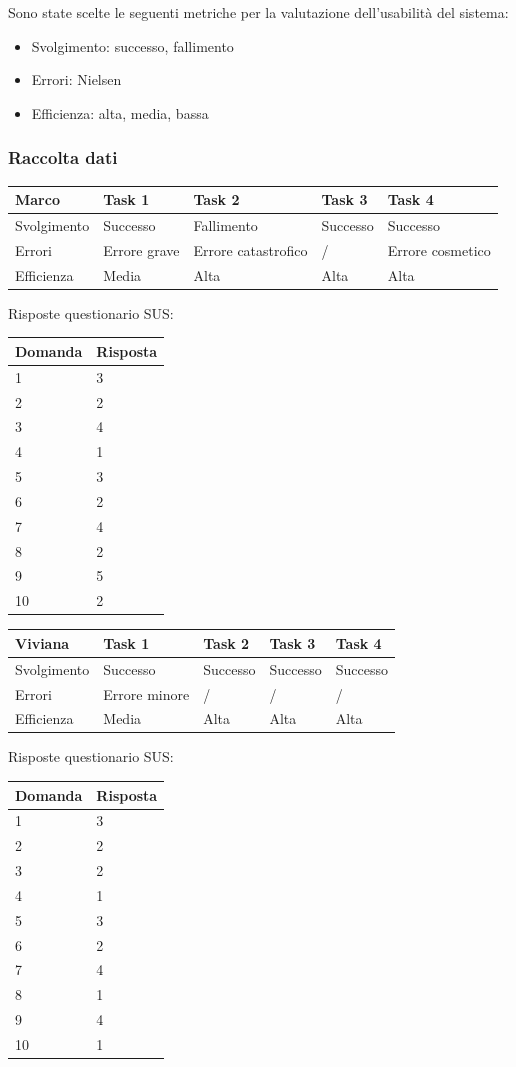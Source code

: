 \documentclass[12pt,italian,]{report}
\providecommand{\tightlist}{%
  \setlength{\itemsep}{0pt}\setlength{\parskip}{0pt}}
\begin{document}
Sono state scelte le seguenti metriche per la valutazione dell'usabilità
del sistema:

\begin{itemize}
\tightlist
\item
  Svolgimento: successo, fallimento
\item
  Errori: Nielsen
\item
  Efficienza: alta, media, bassa
\end{itemize}

\hypertarget{raccolta-dati}{%
\subsubsection{Raccolta dati}\label{raccolta-dati}}

\begin{longtable}[]{@{}lllll@{}}
\toprule
Marco & Task 1 & Task 2 & Task 3 & Task 4\tabularnewline
\midrule
\endhead
Svolgimento & Successo & Fallimento & Successo & Successo\tabularnewline
Errori & Errore grave & Errore catastrofico & / & Errore
cosmetico\tabularnewline
Efficienza & Media & Alta & Alta & Alta\tabularnewline
\bottomrule
\end{longtable}

Risposte questionario SUS:

\begin{longtable}[]{@{}ll@{}}
\toprule
Domanda & Risposta\tabularnewline
\midrule
\endhead
1 & 3\tabularnewline
2 & 2\tabularnewline
3 & 4\tabularnewline
4 & 1\tabularnewline
5 & 3\tabularnewline
6 & 2\tabularnewline
7 & 4\tabularnewline
8 & 2\tabularnewline
9 & 5\tabularnewline
10 & 2\tabularnewline
\bottomrule
\end{longtable}

\begin{longtable}[]{@{}lllll@{}}
\toprule
Viviana & Task 1 & Task 2 & Task 3 & Task 4\tabularnewline
\midrule
\endhead
Svolgimento & Successo & Successo & Successo & Successo\tabularnewline
Errori & Errore minore & / & / & /\tabularnewline
Efficienza & Media & Alta & Alta & Alta\tabularnewline
\bottomrule
\end{longtable}

Risposte questionario SUS:

\begin{longtable}[]{@{}ll@{}}
\toprule
Domanda & Risposta\tabularnewline
\midrule
\endhead
1 & 3\tabularnewline
2 & 2\tabularnewline
3 & 2\tabularnewline
4 & 1\tabularnewline
5 & 3\tabularnewline
6 & 2\tabularnewline
7 & 4\tabularnewline
8 & 1\tabularnewline
9 & 4\tabularnewline
10 & 1\tabularnewline
\bottomrule
\end{longtable}
\end{document}
